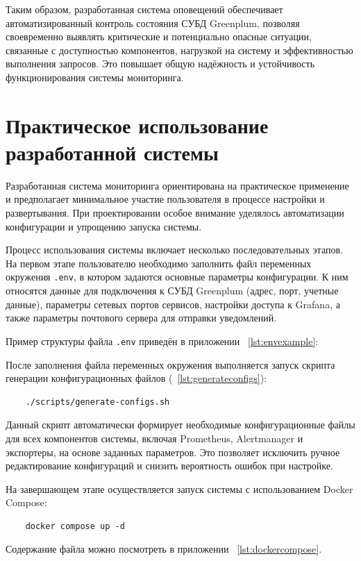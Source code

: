 Таким образом, разработанная система оповещений обеспечивает автоматизированный контроль состояния СУБД Greenplum, позволяя своевременно выявлять критические и потенциально опасные ситуации, связанные с доступностью компонентов, нагрузкой на систему и эффективностью выполнения запросов. Это повышает общую надёжность и устойчивость функционирования системы мониторинга.

\section{Практическое использование разработанной системы} \label{ch2:usage}

Разработанная система мониторинга ориентирована на практическое применение и предполагает минимальное участие пользователя в процессе настройки и развертывания. При проектировании особое внимание уделялось автоматизации конфигурации и упрощению запуска системы.

Процесс использования системы включает несколько последовательных этапов. На первом этапе пользователю необходимо заполнить файл переменных окружения \texttt{.env}, в котором задаются основные параметры конфигурации. К ним относятся данные для подключения к СУБД Greenplum (адрес, порт, учетные данные), параметры сетевых портов сервисов, настройки доступа к Grafana, а также параметры почтового сервера для отправки уведомлений.

Пример структуры файла \texttt{.env} приведён в приложении ~\ref{lst:envexample}:

После заполнения файла переменных окружения выполняется запуск скрипта генерации конфигурационных файлов (~\ref{lst:generateconfigs}):

\begin{verbatim}
	./scripts/generate-configs.sh
\end{verbatim}

Данный скрипт автоматически формирует необходимые конфигурационные файлы для всех компонентов системы, включая Prometheus, Alertmanager и экспортеры, на основе заданных параметров. Это позволяет исключить ручное редактирование конфигураций и снизить вероятность ошибок при настройке.

На завершающем этапе осуществляется запуск системы с использованием Docker Compose:

\begin{verbatim}
	docker compose up -d
\end{verbatim}

Содержание файла можно посмотреть в приложении ~\ref{lst:dockercompose}.


